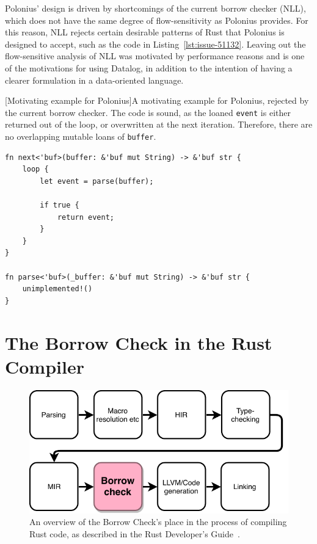 \documentclass[11pt,a4paper,twoside,openany]{report}
\newenvironment{sourcecode}{\captionsetup{type=listing}}{}
\newcommand{\InRust}[1]{\texttt{#1}}
\begin{document}
Polonius' design is driven by shortcomings of the current borrow checker (NLL),
which does not have the same degree of flow-sensitivity as Polonius provides.
For this reason, NLL rejects certain desirable patterns of Rust that Polonius is
designed to accept, such as the code in Listing~\ref{lst:issue-51132}. Leaving
out the flow-sensitive analysis of NLL was motivated by performance reasons and
is one of the motivations for using Datalog, in addition to the intention of
having a clearer formulation in a data-oriented language.

\begin{sourcecode}
  [Motivating example for Polonius]{A motivating example for
    Polonius, rejected by the current borrow checker. The code is sound, as the
    loaned \InRust{event} is either returned out of the loop, or overwritten at
    the next iteration. Therefore, there are no overlapping mutable loans of
    \InRust{buffer}.\cite{issue-51132}}\label{lst:issue-51132}
\begin{verbatim}
fn next<'buf>(buffer: &'buf mut String) -> &'buf str {
    loop {
        let event = parse(buffer);

        if true {
            return event;
        }
    }
}

fn parse<'buf>(_buffer: &'buf mut String) -> &'buf str {
    unimplemented!()
}
\end{verbatim}
\end{sourcecode}

\section{The Borrow Check in the Rust Compiler}
\label{sec:rust-specificts}

\begin{figure}
  \includegraphics[width=0.9\linewidth]{Graphs/rustc-overview}
  \caption[The Rust Compilation Process]{An overview of the Borrow Check's place
    in the process of compiling Rust code, as described in the Rust Developer's
    Guide~\cite{rustc_developers_guide_nodate}.}
  \label{fig:rustc-overview}
\end{figure}
\end{document}
